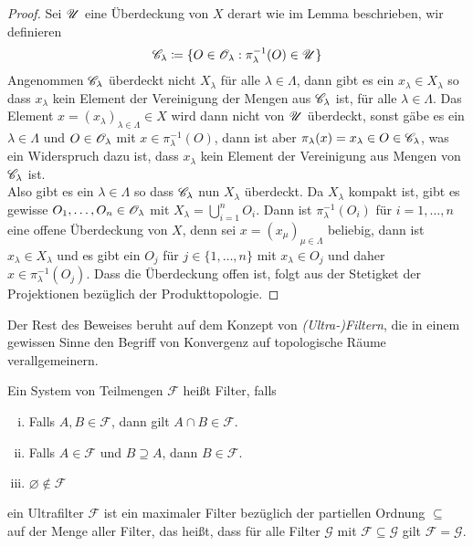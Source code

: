 \begin{proof}
    Sei $\mathscr{U}$ eine Überdeckung von $X$ derart wie im Lemma beschrieben, wir definieren
    \[
    \mathscr{C}_\lambda \coloneqq \{ O\in \mathscr{O}_\lambda : \pi_\lambda^{-1}(O)\in \mathscr{U}\}    
    \]
    Angenommen $\mathscr{C}_\lambda$ überdeckt nicht $X_\lambda$ für alle $\lambda\in \Lambda$, dann gibt es ein $x_\lambda\in X_\lambda$ so dass $x_\lambda$ kein Element der Vereinigung der Mengen aus $\mathscr{C}_\lambda$ ist, für alle $\lambda\in \Lambda$. Das Element $x=(x_\lambda)_{\lambda\in \Lambda}\in X$ wird dann nicht von $\mathscr{U}$ überdeckt, sonst gäbe 
    es ein $\lambda\in \Lambda$ und $O\in \mathscr{O}_\lambda$ mit $x\in \pi_\lambda^{-1}(O)$, dann ist aber $\pi_\lambda(x)=x_\lambda \in O\in \mathscr{C}_\lambda$, was ein Widerspruch dazu ist, dass $x_\lambda$ kein Element der Vereinigung aus Mengen von $\mathscr{C}_\lambda$ ist. \\
    Also gibt es ein $\lambda\in \Lambda$ so dass $\mathscr{C}_\lambda$ nun $X_\lambda$ überdeckt. Da $X_\lambda$ kompakt ist, gibt es gewisse $O_1,\ldots,O_n\in \mathscr{O}_\lambda$ mit 
    $X_\lambda = \bigcup_{i=1}^n O_i$. Dann ist $\pi_\lambda^{-1}(O_i)$ für $i=1,\ldots,n$ eine offene Überdeckung von $X$, denn 
    sei $x=(x_\mu)_{\mu\in\Lambda}$ beliebig, dann ist $x_\lambda\in X_\lambda$ und es gibt ein $O_j$ für $j\in \{1,\ldots,n\}$ mit $x_\lambda\in O_j$ und daher $x\in \pi_\lambda^{-1}(O_j)$. Dass die Überdeckung offen ist, folgt aus der Stetigket der Projektionen bezüglich der Produkttopologie.  
\end{proof}
Der Rest des Beweises beruht auf dem Konzept von \textit{(Ultra-)Filtern}, die in einem gewissen Sinne den Begriff von Konvergenz auf topologische Räume verallgemeinern. 
\begin{defn}
    Ein System von Teilmengen $\mathcal{F}$ heißt Filter, falls
    \begin{enumerate}[(i)]
        \item Falls $A,B\in \mathcal{F}$, dann gilt $A\cap B\in \mathcal{F}$.
        \item Falls $A\in \mathcal{F}$ und $B\supseteq A$, dann $B\in \mathcal{F}$.
        \item $\varnothing\notin \mathcal{F}$
    \end{enumerate}
    ein Ultrafilter $\mathcal{F}$ ist ein maximaler Filter bezüglich der partiellen Ordnung $\subseteq$ auf der Menge aller Filter, das heißt, dass für alle Filter $\mathcal{G}$ mit $\mathcal{F}\subseteq \mathcal{G}$ gilt $\mathcal{F}=\mathcal{G}$. 
\end{defn}
